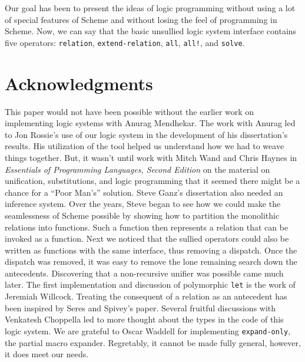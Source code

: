 Our goal has been to present the ideas of logic programming without
using a lot of special features of Scheme and without losing the feel
of programming in Scheme.  Now, we can say that the basic unsullied
logic system interface contains five operators: \texttt{relation},
\texttt{extend-relation}, \texttt{all}, \texttt{all!}, and
\texttt{solve}.
\section{Acknowledgments}

This paper would not have been possible without the earlier work on
implementing logic systems with Anurag Mendhekar.  The work with
Anurag led to Jon Rossie's use of our logic system in the development
of his dissertation's results.  His utilization of the tool helped us
understand how we had to weave things together.  But, it wasn't until
work with Mitch Wand and Chris Haynes in \emph{Essentials of
Programming Languages, Second Edition} on the material on unification,
substitutions, and logic programming that it seemed there might be a
chance for a ``Poor Man's'' solution.  Steve Ganz's dissertation also
needed an inference system.  Over the years, Steve began to see how we
could make the seamlessness of Scheme possible by showing how to
partition the monolithic relations into functions.  Such a function
then represents a relation that can be invoked as a function.  Next we
noticed that the sullied operators could also be written as functions
with the same interface, thus removing a dispatch.  Once the dispatch
was removed, it was easy to remove the lone remaining search down the
antecedents.  Discovering that a non-recursive unifier was possible
came much later.  The first implementation and discussion of
polymorphic \texttt{let} is the work of Jeremiah Willcock.  Treating
the consequent of a relation as an antecedent has been inspired by
Seres and Spivey's paper.  Several fruitful discussions with Venkatesh
Choppella led to more thought about the types in the code of this
logic system.  We are grateful to Oscar Waddell for implementing
\texttt{expand-only}, the partial macro expander.  Regretably, it
cannot be made fully general, however, it does meet our needs.




